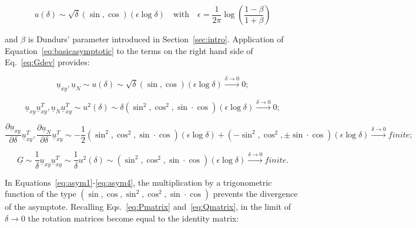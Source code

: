 \documentclass[review]{elsarticle}
\begin{document}
\begin{equation}\label{eq:basicasymptotic}
u\left(\delta\right)\sim \sqrt{\delta}\left(\sin,\cos\right)\left(\epsilon\log{\delta}\right)\quad\text{with}\quad\epsilon=\frac{1}{2\pi}\log{\left(\frac{1-\beta}{1+\beta}\right)}
\end{equation}

and $\beta$ is Dundurs' parameter introduced in Section~\ref{sec:intro}. Application of Equation~\ref{eq:basicasymptotic} to the terms on the right hand side of Eq.~\ref{eq:Gdev} provides:

\begin{equation}\label{eq:asym1}
\underline{u}_{xy},\underline{u}_{N}\sim u\left(\delta\right)\sim\sqrt{\delta}\left(\sin,\cos\right)\left(\epsilon\log{\delta}\right)\xrightarrow{\delta\rightarrow 0}0;
\end{equation}

\begin{equation}\label{eq:asym2}
\underline{u}_{xy}\underline{u}_{xy}^{T},\underline{u}_{N}\underline{u}_{xy}^{T}\sim u^{2}\left(\delta\right)\sim\delta\left(\sin^{2},\cos^{2},\sin\cdot\cos\right)\left(\epsilon\log{\delta}\right)\xrightarrow{\delta\rightarrow 0}0;
\end{equation}

\begin{equation}\label{eq:asym3}
\frac{\partial \underline{u}_{xy}}{\partial \delta}\underline{u}_{xy}^{T},\frac{\partial \underline{u}_{N}}{\partial \delta}\underline{u}_{xy}^{T}\sim -\frac{1}{2}\left(\sin^{2},\cos^{2},\sin\cdot\cos\right)\left(\epsilon\log{\delta}\right)+\left(-\sin^{2},\cos^{2},\pm\sin\cdot\cos\right)\left(\epsilon\log{\delta}\right)\xrightarrow{\delta\rightarrow 0}finite;
\end{equation}

\begin{equation}\label{eq:asym4}
\underline{G}\sim\frac{1}{\delta}\underline{u}_{xy}\underline{u}_{xy}^{T}\sim \frac{1}{\delta}u^{2}\left(\delta\right)\sim\left(\sin^{2},\cos^{2},\sin\cdot\cos\right)\left(\epsilon\log{\delta}\right)\xrightarrow{\delta\rightarrow 0}finite.
\end{equation}

In Equations~\ref{eq:asym1}-\ref{eq:asym4}, the multiplication by a trigonometric function of the type $\left(\sin,\cos,\sin^{2},\cos^{2},\sin\cdot\cos\right)$ prevents the divergence of the asymptote. Recalling Eqs.~\ref{eq:Pmatrix} and~\ref{eq:Qmatrix}, in the limit of $\delta\rightarrow 0$ the rotation matrices become equal to the identity matrix:
\end{document}
